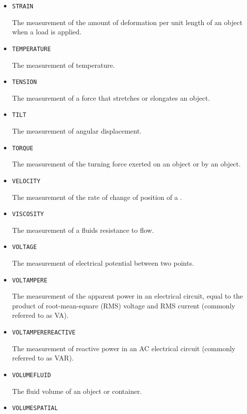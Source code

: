 \begin{itemize}
\item \texttt{STRAIN}  

The measurement of the amount of deformation per unit length of an object when a load is applied.


\item \texttt{TEMPERATURE}  

The measurement of temperature.


\item \texttt{TENSION}  

The measurement of a force that stretches or elongates an object.


\item \texttt{TILT}  

The measurement of angular displacement.


\item \texttt{TORQUE}  

The measurement of the turning force exerted on an object or by an object.


\item \texttt{VELOCITY}  

The measurement of the rate of change of position of a .


\item \texttt{VISCOSITY}  

The measurement of a fluids resistance to flow.


\item \texttt{VOLTAGE}  

The measurement of electrical potential between two points.


\item \texttt{VOLT\textunderscore AMPERE}  

The measurement of the apparent power in an electrical circuit, equal to the product of root-mean-square (RMS) voltage and RMS current (commonly referred to as VA).


\item \texttt{VOLT\textunderscore AMPERE\textunderscore REACTIVE}  

The measurement of reactive power in an AC electrical circuit (commonly referred to as VAR).


\item \texttt{VOLUME\textunderscore FLUID}  

The fluid volume of an object or container.


\item \texttt{VOLUME\textunderscore SPATIAL}  


\end{itemize}
